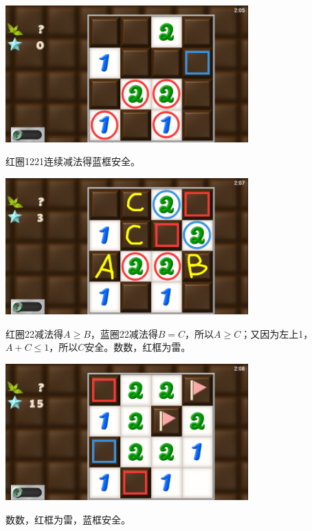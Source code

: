 \subsection{} %
\begin{center}
    \includegraphics[width=0.7\textwidth]{puzzle/140-1.png}
\end{center}
红圈1221连续减法得蓝框安全。
\begin{center}
    \includegraphics[width=0.7\textwidth]{puzzle/140-2.png}
\end{center}
红圈22减法得$A\ge B$，蓝圈22减法得$B=C$，所以$A\ge C$；又因为左上1，$A+C\le 1$，所以$C$安全。数数，红框为雷。
\begin{center}
    \includegraphics[width=0.7\textwidth]{puzzle/140-3.png}
\end{center}
数数，红框为雷，蓝框安全。

